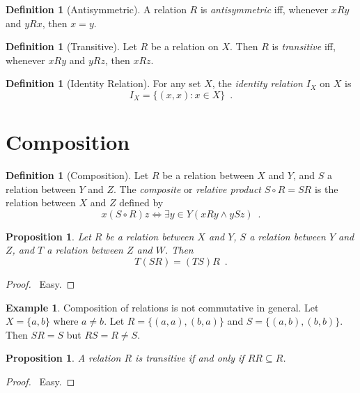 \documentclass{report}
\let\qed\relax
\newtheorem{prop}[ax]{Proposition}
\theoremstyle{definition}
\newtheorem{df}[ax]{Definition}
\newtheorem{ex}[ax]{Example}
\begin{document}
\begin{df}[Antisymmetric]
A relation $R$ is \emph{antisymmetric} iff, whenever $xRy$ and $yRx$, then $x = y$.
\end{df}

\begin{df}[Transitive]
Let $R$ be a relation on $X$. Then $R$ is \emph{transitive} iff, whenever $xRy$ and $yRz$, then $xRz$.
\end{df}

\begin{df}[Identity Relation]
For any set $X$, the \emph{identity relation} $I_X$ on $X$ is
\[ I_X = \{(x,x) : x \in X \} \enspace . \]
\end{df}

\section{Composition}

\begin{df}[Composition]
Let $R$ be a relation between $X$ and $Y$, and $S$ a relation between $Y$ and $Z$. The \emph{composite} or \emph{relative product} $S \circ R = SR$ is the relation between $X$ and $Z$ defined by
\[ x (S \circ R) z \Leftrightarrow \exists y \in Y (xRy \wedge ySz) \enspace . \]
\end{df}

\begin{prop}
Let $R$ be a relation between $X$ and $Y$, $S$ a relation between $Y$ and $Z$, and $T$ a relation between $Z$ and $W$. Then
\[ T(SR) = (TS)R \enspace . \]
\end{prop}

\begin{proof}
\pf\ Easy. \qed
\end{proof}

\begin{ex}
\label{ex:composition_not_commutative}
Composition of relations is not commutative in general. Let $X = \{a,b\}$ where $a \neq b$. Let $R = \{(a,a),(b,a)\}$ and $S = \{(a,b),(b,b)\}$. Then $SR = S$ but $RS = R \neq S$.
\end{ex}

\begin{prop}
A relation $R$ is transitive if and only if $RR \subseteq R$.
\end{prop}

\begin{proof}
\pf\ Easy. \qed
\end{proof}
\end{document}

